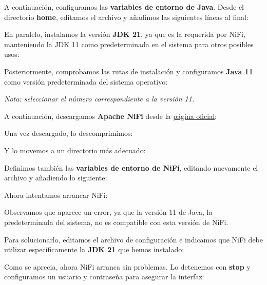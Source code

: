 \documentclass{../../miPlantilla}
\begin{document}
A continuación, configuramos las \textbf{variables de entorno de Java}. Desde el directorio \textbf{home}, editamos el archivo  y añadimos las siguientes líneas al final:


\newpage

En paralelo, instalamos la versión \textbf{JDK 21}, ya que es la requerida por NiFi, manteniendo la JDK 11 como predeterminada en el sistema para otros posibles usos:


Posteriormente, comprobamos las rutas de instalación y configuramos \textbf{Java 11} como versión predeterminada del sistema operativo:


\textit{Nota: seleccionar el número correspondiente a la versión 11.}


A continuación, descargamos \textbf{Apache NiFi} desde la \href{https://nifi.apache.org/}{página oficial}:


Una vez descargado, lo descomprimimos:


Y lo movemos a un directorio más adecuado:


Definimos también las \textbf{variables de entorno de NiFi}, editando nuevamente el archivo  y añadiendo lo siguiente:


Ahora intentamos arrancar NiFi:


Observamos que aparece un error, ya que la versión 11 de Java, la predeterminada del sistema, no es compatible con esta versión de NiFi.

\newpage

Para solucionarlo, editamos el archivo de configuración  e indicamos que NiFi debe utilizar específicamente la \textbf{JDK 21} que hemos instalado:


Como se aprecia, ahora NiFi arranca sin problemas. Lo detenemos con  \textbf{stop} y configuramos un usuario y contraseña para asegurar la interfaz:

\end{document}
